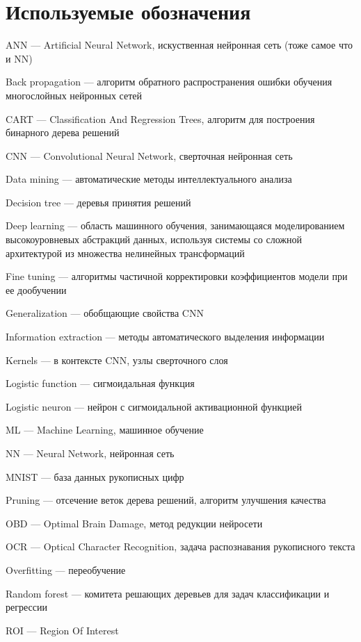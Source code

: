\documentclass[a4paper,14pt]{extarticle} %
\begin{document}
\newpage
\section*{Используемые обозначения}
ANN --- Artificial Neural Network, искуственная нейронная сеть (тоже самое что и NN)

\noindent Back propagation --- алгоритм обратного распространения ошибки обучения многослойных нейронных сетей 

\noindent CART --- Classification And Regression Trees, алгоритм  для построения бинарного дерева решений

\noindent CNN --- Convolutional Neural Network, сверточная нейронная сеть

\noindent Data mining --- автоматические методы интеллектуального анализа

\noindent Decision tree --- деревья принятия решений

\noindent Deep learning --- область машинного обучения, занимающаяся моделированием высокоуровневых абстракций данных, используя системы со сложной архитектурой из множества нелинейных трансформаций

\noindent Fine tuning --- алгоритмы частичной корректировки коэффициентов модели при ее дообучении

\noindent Generalization --- обобщающие свойства CNN

\noindent Information extraction --- методы автоматического выделения информации

\noindent Kernels --- в контексте CNN, узлы сверточного слоя

\noindent Logistic function --- сигмоидальная функция 

\noindent Logistic neuron --- нейрон с сигмоидальной активационной функцией

\noindent ML --- Machine Learning, машинное обучение

\noindent NN --- Neural Network, нейронная сеть

\noindent MNIST --- база данных рукописных цифр

\noindent Pruning --- отсечение веток дерева решений, алгоритм улучшения качества

\noindent OBD --- Optimal Brain Damage, метод редукции нейросети

\noindent OCR --- Optical Character Recognition, задача распознавания рукописного текста

\noindent Overfitting --- переобучение 

\noindent Random forest --- комитета решающих деревьев для задач классификации и регрессии

\noindent ROI --- Region Of Interest 

\newpage
\begin{flushleft}
\end{flushleft}
\end{document}
